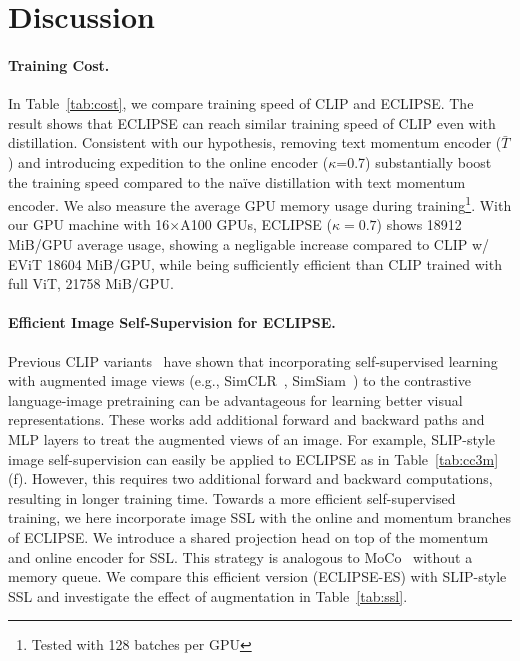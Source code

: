 \section{Discussion}
\label{sec:discussion}

\paragraph{Training Cost.}
In Table~\ref{tab:cost}, we compare training speed of CLIP and ECLIPSE. 
The result shows that ECLIPSE can reach similar training speed of CLIP even with distillation.
Consistent with our hypothesis, removing text momentum encoder ($\bar{T}$) and introducing expedition to the online encoder ($\kappa$=0.7) substantially boost the training speed compared to the na\"ive distillation with text momentum encoder.
We also measure the average GPU memory usage during training\footnote{Tested with 128 batches per GPU}.
With our GPU machine with 16$\times$A100 GPUs, ECLIPSE ($\kappa=0.7$) shows 18912 MiB/GPU average usage, showing a negligable increase compared to CLIP w/ EViT 18604 MiB/GPU, while being sufficiently efficient than CLIP trained with full ViT, 21758 MiB/GPU.


\paragraph{Efficient Image Self-Supervision for ECLIPSE.}
Previous CLIP variants~\cite{mu2021slip,li2022supervision} have shown that incorporating self-supervised learning with augmented image views (e.g., SimCLR~\cite{chen2020simple}, SimSiam~\cite{chen2021exploring}) to the contrastive language-image pretraining can be advantageous for learning better visual representations.
These works add additional forward and backward paths and MLP layers to treat the augmented views of an image.
For example, SLIP-style image self-supervision can easily be applied to ECLIPSE as in Table~\ref{tab:cc3m}(f).
However, this requires two additional forward and backward computations, resulting in longer training time.
Towards a more efficient self-supervised training, we here incorporate image SSL with the online and momentum branches of ECLIPSE.
We introduce a shared projection head on top of the momentum and online encoder for SSL.
This strategy is analogous to MoCo~\cite{he2020moco,Chen2020mocov2} without a memory queue.
We compare this efficient version (ECLIPSE-ES) with SLIP-style SSL and investigate the effect of augmentation in Table~\ref{tab:ssl}.

